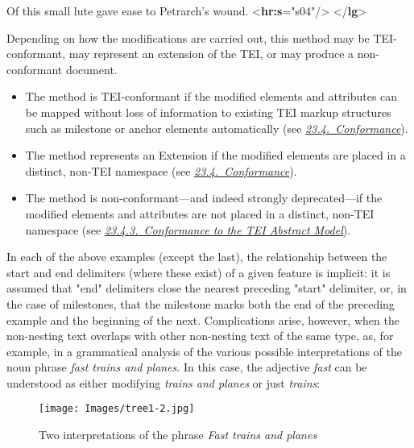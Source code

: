 \begin{shaded}
Of this small lute gave ease to Petrarch's wound. {<\textbf{hr:s}\hspace*{1em}{eID}="{s04}"/>}\mbox{}\newline 
{}\mbox{}\newline 
{</\textbf{lg}>}\end{shaded}\egroup\par \noindent  Depending on how the modifications are carried out, this method may be TEI-conformant, may represent an extension of the TEI, or may produce a non-conformant document. \begin{itemize}
\item The method is TEI-conformant if the modified elements and attributes can be mapped without loss of information to existing TEI markup structures such as milestone or anchor elements automatically (see \textit{\hyperref[CF]{23.4.\ Conformance}}).
\item The method represents an Extension if the modified elements are placed in a distinct, non-TEI namespace (see \textit{\hyperref[CF]{23.4.\ Conformance}}).
\item The method is non-conformant—and indeed strongly deprecated—if the modified elements and attributes are not placed in a distinct, non-TEI namespace (see \textit{\hyperref[CFAM]{23.4.3.\ Conformance to the TEI Abstract Model}}).
\end{itemize} \par
In each of the above examples (except the last), the relationship between the start and end delimiters (where these exist) of a given feature is implicit: it is assumed that "end" delimiters close the nearest preceding "start" delimiter, or, in the case of milestones, that the milestone marks both the end of the preceding example and the beginning of the next. Complications arise, however, when the non-nesting text overlaps with other non-nesting text of the same type, as, for example, in a grammatical analysis of the various possible interpretations of the  noun phrase \textit{fast trains and planes}. In this case, the adjective \textit{fast} can be understood as either modifying \textit{trains and planes} or just \textit{trains}: \begin{figure}[htbp]
\noindent\texttt{[image: Images/tree1-2.jpg]}
\caption{Two interpretations of the phrase \textit{Fast trains and planes}}\end{figure}
